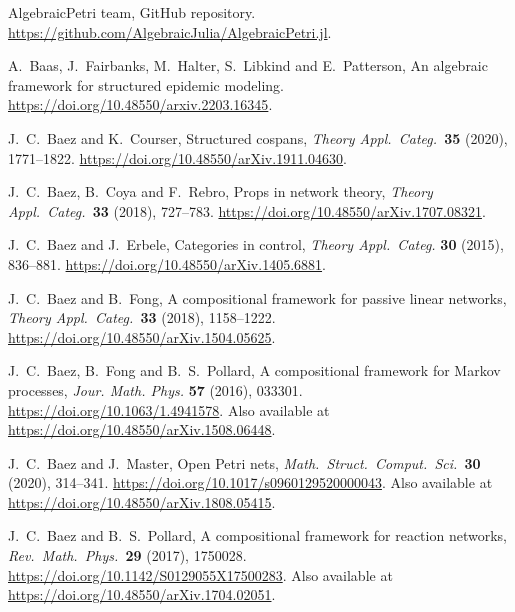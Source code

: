 \documentclass[a4paper,onecolumn, superscriptaddress,10pt, accepted=2022-03-25, issue=SS, volume=VV, shorttitle=papers/compositionality-VV-SS]{compositionalityarticle}
\begin{document}
\begin{thebibliography}{100}

 AlgebraicPetri team, GitHub repository. 
\href{https://github.com/AlgebraicJulia/AlgebraicPetri.jl}{https://github.com/AlgebraicJulia/AlgebraicPetri.jl}.

  A.\ Baas, J.\ Fairbanks, M.\ Halter, S.\ Libkind and E.\ Patterson, An
algebraic framework for structured epidemic modeling.  \href{https://doi.org/10.48550/arxiv.2203.16345}{https://doi.org/10.48550/arxiv.2203.16345}.

 J.\ C.\ Baez and K.\ Courser, Structured cospans,  \textsl{Theory Appl.\ Categ.\ }\textbf{35} (2020), 1771--1822.    	\href{https://doi.org/10.48550/arXiv.1911.04630}{https://doi.org/10.48550/arXiv.1911.04630}.

 J.\ C.\ Baez, B.\ Coya and F.\ Rebro, Props in network theory, \textsl{Theory Appl.\ Categ.\ }\textbf{33} (2018), 727--783.    	\href{https://doi.org/10.48550/arXiv.1707.08321}{https://doi.org/10.48550/arXiv.1707.08321}.

 J.\ C.\ Baez and J.\ Erbele, Categories in control, \textsl{Theory Appl.\ Categ.} {\bf 30} (2015), 836--881.  \href{https://doi.org/10.48550/arXiv.1405.6881}{https://doi.org/10.48550/arXiv.1405.6881}.

  J.\ C.\ Baez and B.\ Fong, A compositional framework for passive linear networks, \textsl{Theory Appl.\ Categ.\ }\textbf{33} (2018), 1158--1222.  \href{https://doi.org/10.48550/arXiv.1504.05625}{https://doi.org/10.48550/arXiv.1504.05625}.

 J.\ C.\ Baez, B.\ Fong and B.\ S.\ Pollard, A compositional framework for Markov processes, \textsl{Jour. Math. Phys.} \textbf{57} (2016), 033301. 
\href{https://doi.org/10.1063/1.4941578}{https://doi.org/10.1063/1.4941578}. Also available at 
\href{https://doi.org/10.48550/arXiv.1508.06448}{https://doi.org/10.48550/arXiv.1508.06448}.

  J.\ C.\ Baez and J.\ Master, Open Petri nets, \textsl{Math.\ Struct.\ Comput.\ Sci.\ }\textbf{30} (2020), 314--341.  \href{https://doi.org/10.1017/s0960129520000043}{https://doi.org/10.1017/s0960129520000043}.
Also available at
\href{https://doi.org/10.48550/arXiv.1808.05415}{https://doi.org/10.48550/arXiv.1808.05415}. 

 J.\ C.\ Baez and B.\ S.\ Pollard, A compositional framework for reaction networks, \textsl{Rev.\ Math.\ Phys.\ }\textbf{29} 
(2017), 1750028. \href{https://doi.org/10.1142/S0129055X17500283}{https://doi.org/10.1142/S0129055X17500283}.   Also available at 
\href{https://doi.org/10.48550/arXiv.1704.02051}{https://doi.org/10.48550/arXiv.1704.02051}.


\end{thebibliography}
\end{document}
